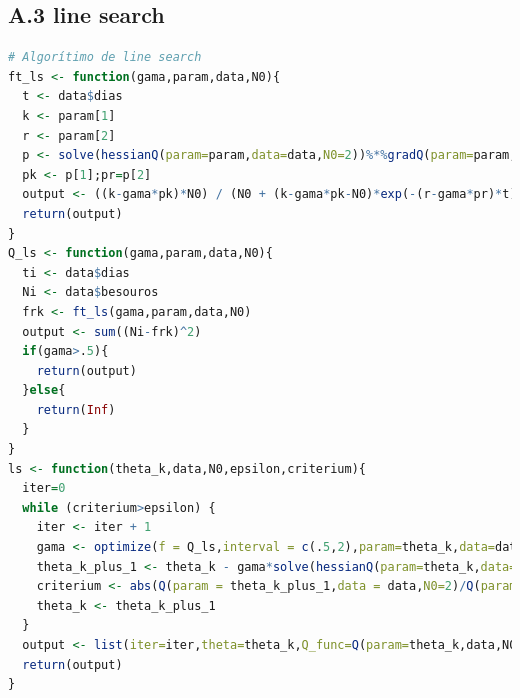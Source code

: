 \documentclass[a4paper,12pt,twoside]{article}
\begin{document}
\subsection*{A.3 line search}
\begin{lstlisting}[language=R]
# Algorítimo de line search
ft_ls <- function(gama,param,data,N0){
  t <- data$dias
  k <- param[1]
  r <- param[2]
  p <- solve(hessianQ(param=param,data=data,N0=2))%*%gradQ(param=param,data=data,N0=2)
  pk <- p[1];pr=p[2]
  output <- ((k-gama*pk)*N0) / (N0 + (k-gama*pk-N0)*exp(-(r-gama*pr)*t)) 
  return(output)
}
Q_ls <- function(gama,param,data,N0){
  ti <- data$dias
  Ni <- data$besouros
  frk <- ft_ls(gama,param,data,N0)
  output <- sum((Ni-frk)^2)
  if(gama>.5){
    return(output)
  }else{
    return(Inf)
  }
}
ls <- function(theta_k,data,N0,epsilon,criterium){
  iter=0
  while (criterium>epsilon) {
    iter <- iter + 1
    gama <- optimize(f = Q_ls,interval = c(.5,2),param=theta_k,data=data,N0=N0)$minimum
    theta_k_plus_1 <- theta_k - gama*solve(hessianQ(param=theta_k,data=data,N0=2))%*%gradQ(param=theta_k,data=data,N0=2)
    criterium <- abs(Q(param = theta_k_plus_1,data = data,N0=2)/Q(param = theta_k,data = data,N0=2) - 1)
    theta_k <- theta_k_plus_1
  }
  output <- list(iter=iter,theta=theta_k,Q_func=Q(param=theta_k,data,N0))
  return(output)
}
\end{lstlisting}
\end{document}
